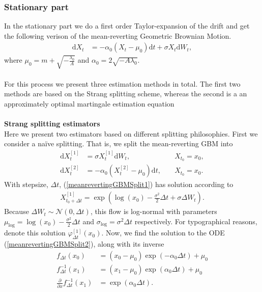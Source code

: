 \subsubsection{Stationary part}\label{subsubsec:meanrevertingGBMStationary}
In the stationary part we do a first order Taylor-expansion of the drift and get the following verison of the mean-reverting Geometric Brownian Motion.
\begin{align}
    \mathrm{d}X_t &= -\alpha_0\left(X_t - \mu_0\right)\mathrm{d}t + \sigma X_t \mathrm{d}W_t, \label{eq:GBM_simple}
\end{align}
where $\mu_0 = m + \sqrt{-\frac{\lambda_0}{A}}$ and $\alpha_0 = 2\sqrt{-A\lambda_0}$.\\\\
For this process we present three estimation methods in total. The first two methods are based on the Strang splitting scheme, whereas the second is a an approximately optimal martingale estimation equation \\\\
\noindent \textbf{Strang splitting estimators}\\
Here we present two estimators based on different splitting philosophies. First we consider a naïve splitting. That is, we split the mean-reverting GBM into
\begin{align}
    \mathrm{d}X_t^{[1]} &= \sigma X_t^{[1]}\mathrm{d}W_t, \; &&X_{t_0} = x_0, \label{meanrevertingGBMSplit1}\\
    \mathrm{d}X_t^{[2]} &= -\alpha_0\left(X_t^{[2]} - \mu_0\right)\mathrm{d}t, \; &&X_{t_0} = x_0. \label{meanrevertingGBMSplit2}
\end{align}
With stepsize, $\Delta t$, (\ref{meanrevertingGBMSplit1}) has solution according to \cite[example 4.7]{Srkk2019}
\begin{align}
    X_{t_0 + \Delta t}^{[1]} = \exp\left(\log(x_0) -\frac{\sigma^2}{2}\Delta t + \sigma \Delta W_t\right).
\end{align}
Because $\Delta W_t\sim\mathcal{N}(0,\Delta t)$, this flow is log-normal with parameters $\mu_{\mathrm{log}} = \log(x_0) -\frac{\sigma^2}{2}\Delta t$ and $\sigma_{\log} = \sigma^2\Delta t$ respectively. For typographical reasons, denote this solution $\varphi_{\Delta t}^{[1]}(x_0)$. Now, we find the solution to the ODE (\ref{meanrevertingGBMSplit2}), along with its inverse 
\begin{align}
    f_{\Delta t}(x_0) &= (x_0 - \mu_0)\exp(-\alpha_0\Delta t) + \mu_0 \label{eq:meanRevertingODESolution}\\
    f_{\Delta t}^{-1}(x_1) &=  (x_1 - \mu_0)\exp(\alpha_0\Delta t) + \mu_0\\
    \frac{\partial}{\partial x} f_{\Delta t}^{-1}(x_1) &= \exp\left(\alpha_0\Delta t\right).
\end{align}
